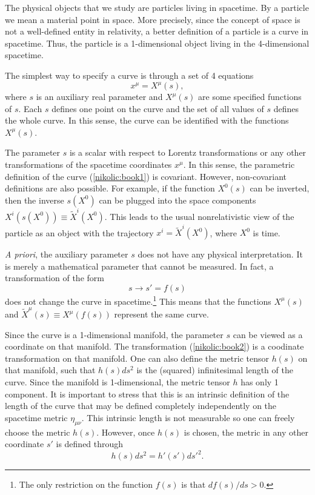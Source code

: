 \documentclass[12pt,twoside]{report} %
\begin{document}
The physical objects that we study are particles living in spacetime. By a particle 
we mean a material point in space. 
More precisely, since the concept of space is not a well-defined entity 
in relativity, a better definition of a particle is a curve in spacetime. Thus, 
the particle is a 1-dimensional object living in the 4-dimensional spacetime.
 
The simplest way to specify a curve is through a set of 4 equations
\begin{equation}\label{nikolic:book1}
x^{\mu}=X^{\mu}(s) ,
\end{equation}
where $s$ is an auxiliary real parameter and $X^{\mu}(s)$ are some 
specified functions of $s$. Each $s$ defines one point on the curve and the set
of all values of $s$ defines the whole curve. In this sense, the curve can be identified
with the functions $X^{\mu}(s)$.

The parameter $s$ is a scalar with respect to Lorentz transformations or any other transformations
of the spacetime coordinates $x^{\mu}$. In this sense, the parametric definition
of the curve (\ref{nikolic:book1}) is covariant. However, non-covariant definitions are also possible.
For example, if the function $X^{0}(s)$ can be inverted, then the inverse $s(X^0)$
can be plugged into the space components  $X^{i}(s(X^0))\equiv \tilde{X}^{i}(X^0)$.
This leads to the usual nonrelativistic view of the particle as an object with the trajectory
$x^i=\tilde{X}^{i}(X^0)$, where $X^0$ is time.

{\it A priori}, the auxiliary parameter $s$ does not have any physical interpretation.
It is merely a mathematical parameter that cannot be measured. In fact, a transformation 
of the form
\begin{equation}\label{nikolic:book2}
 s\rightarrow s'=f(s) 
\end{equation}
does not change the curve in spacetime.\footnote{The only restriction on the function
$f(s)$ is that $df(s)/ds >0$.} This means that the functions $X^{\mu}(s)$
and $\tilde{X}^{\mu}(s)\equiv X^{\mu}(f(s))$ represent the same curve.

Since the curve is a 1-dimensional manifold, the parameter $s$ can be viewed as a
coordinate on that manifold. The transformation (\ref{nikolic:book2}) is a 
coodinate transformation on that manifold. One can also define the metric
tensor $h(s)$ on that manifold, such that $h(s)ds^2$ is the (squared) infinitesimal
length of the curve. Since the manifold is 1-dimensional, the metric tensor
$h$ has only 1 component. It is important to stress that this is an
intrinsic definition of the length of the curve that may be defined completely
independently on the spacetime metric $\eta_{\mu\nu}$.
This intrinsic length is not measurable so one can freely choose the metric $h(s)$.
However, once $h(s)$ is chosen, the metric in any other coordinate $s'$ is defined
through
\begin{equation}\label{nikolic:book3}
 h(s)ds^2 = h'(s')ds'^2 .
\end{equation}
\end{document}
